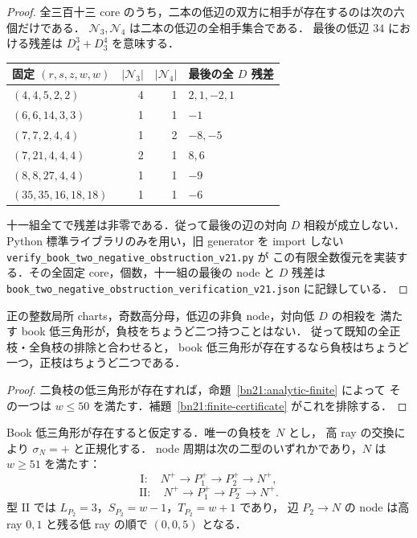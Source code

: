 \begin{proof}
全三百十三 core のうち，二本の低辺の双方に相手が存在するのは次の六個だけである．
$\mathcal N_3,\mathcal N_4$ は二本の低辺の全相手集合である．
最後の低辺 $34$ における残差は $D^3_4+D^4_3$ を意味する．
\begin{center}
\small
\begin{tabular}{lrrl}
固定 $(r,s,z,w,w)$ & $|\mathcal N_3|$ & $|\mathcal N_4|$ & 最後の全 $D$ 残差\\
\hline
$(4,4,5,2,2)$ & 4 & 1 & $2,1,-2,1$\\
$(6,6,14,3,3)$ & 1 & 1 & $-1$\\
$(7,7,2,4,4)$ & 1 & 2 & $-8,-5$\\
$(7,21,4,4,4)$ & 2 & 1 & $8,6$\\
$(8,8,27,4,4)$ & 1 & 1 & $-9$\\
$(35,35,16,18,18)$ & 1 & 1 & $-6$\\
\end{tabular}
\end{center}
十一組全てで残差は非零である．従って最後の辺の対向 $D$ 相殺が成立しない．
Python 標準ライブラリのみを用い，旧 generator を import しない
\nolinkurl{verify_book_two_negative_obstruction_v21.py} が
この有限全数復元を実装する．その全固定 core，個数，十一組の最後の node と
$D$ 残差は \nolinkurl{book_two_negative_obstruction_verification_v21.json}
に記録している．
\end{proof}

\begin{theorem}
\label{bn21:two-negative-obstruction}
正の整数局所 charts，奇数高分母，低辺の非負 node，対向低 $D$ の相殺を
満たす book 低三角形が，負枝をちょうど二つ持つことはない．
従って既知の全正枝・全負枝の排除と合わせると，
book 低三角形が存在するなら負枝はちょうど一つ，正枝はちょうど二つである．
\end{theorem}

\begin{proof}
二負枝の低三角形が存在すれば，命題~\ref{bn21:analytic-finite} によって
その一つは $w\le50$ を満たす．補題~\ref{bn21:finite-certificate} がこれを排除する．
\end{proof}

\begin{corollary}
\label{bn21:one-negative-normal-forms}
Book 低三角形が存在すると仮定する．唯一の負枝を $N$ とし，
高 ray の交換により $\sigma_N=+$ と正規化する．
node 周期は次の二型のいずれかであり，$N$ は $w\ge51$ を満たす：
\[
 \mathrm{I}:\quad N^+\longrightarrow P_1^+\longrightarrow P_2^+
 \longrightarrow N^+,
\]
\[
 \mathrm{II}:\quad N^+\longrightarrow P_1^+\longrightarrow P_2^-
 \longrightarrow N^+.
\]
型 II では $L_{P_2}=3$，$S_{P_2}=w-1$，$T_{P_2}=w+1$ であり，
辺 $P_2\to N$ の node は高 ray $0,1$ と残る低 ray の順で $(0,0,5)$ となる．
\end{corollary}


